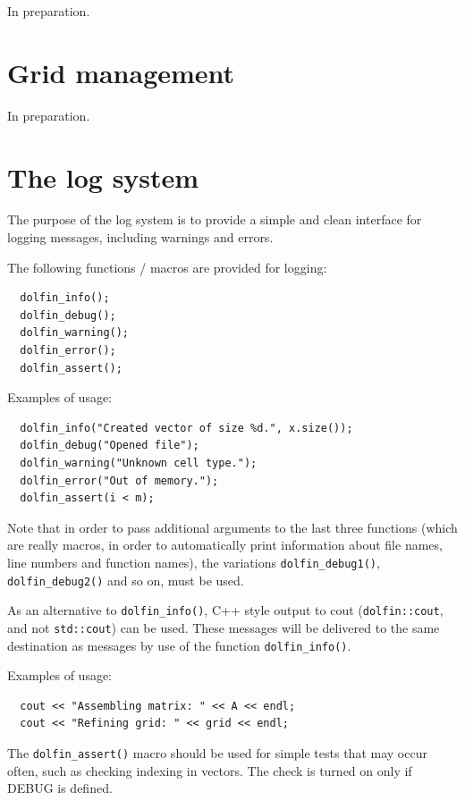 \documentclass[12pt]{article}
\begin{document}
In preparation.

\cleardoublepage
\section{Grid management}

In preparation.

\cleardoublepage
\section{The log system}

The purpose of the log system is to provide a simple and
clean interface for logging messages, including warnings
and errors.

The following functions / macros are provided for logging:

\begin{verbatim}
  dolfin_info();
  dolfin_debug();
  dolfin_warning();
  dolfin_error();
  dolfin_assert();
\end{verbatim}

Examples of usage:

\begin{verbatim}
  dolfin_info("Created vector of size %d.", x.size());
  dolfin_debug("Opened file");
  dolfin_warning("Unknown cell type.");
  dolfin_error("Out of memory.");
  dolfin_assert(i < m);
\end{verbatim}

Note that in order to pass additional arguments to the last
three functions (which are really macros, in order to
automatically print information about file names, line numbers
and function names), the variations \texttt{dolfin\_debug1()},
\texttt{dolfin\_debug2()} and so on, must be used.

As an alternative to \texttt{dolfin\_info()}, C++ style output to cout
(\texttt{dolfin::cout}, and not \texttt{std::cout}) can be used. These messages
will be delivered to the same destination as messages by use
of the function \texttt{dolfin\_info()}.

Examples of usage:

\begin{verbatim}
  cout << "Assembling matrix: " << A << endl;
  cout << "Refining grid: " << grid << endl;
\end{verbatim}

The \texttt{dolfin\_assert()} macro should be used for simple tests that
may occur often, such as checking indexing in vectors. The check
is turned on only if DEBUG is defined.
\end{document}
